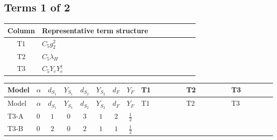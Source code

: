 \documentclass[8pt]{article}
\begin{document}
\begin{landscape}
\subsection*{Terms 1 of 2}
\begin{center}
\begin{tabular}{@{}c >{\raggedright\arraybackslash}p{0.82\linewidth}@{}}
\toprule
Column & Representative term structure \\
\midrule
T1 & \(\displaystyle C_{5} g_{2}^{2}\) \\
\midrule
T2 & \(\displaystyle C_{5} \lambda_H\) \\
\midrule
T3 & \(\displaystyle C_{5} Y_e Y_e^\dagger\) \\
\midrule
\bottomrule
\end{tabular}
\end{center}
\smallskip
\tiny
\begin{longtable}{@{}llcccccc >{\raggedright\arraybackslash}p{0.21\linewidth} >{\raggedright\arraybackslash}p{0.21\linewidth} >{\raggedright\arraybackslash}p{0.21\linewidth}@{}}
\toprule
Model & $\alpha$ & $d_{S_1}$ & $Y_{S_1}$ & $d_{S_2}$ & $Y_{S_2}$ & $d_F$ & $Y_F$ & T1 & T2 & T3 \\
\midrule
\endfirsthead
\toprule
Model & $\alpha$ & $d_{S_1}$ & $Y_{S_1}$ & $d_{S_2}$ & $Y_{S_2}$ & $d_F$ & $Y_F$ & T1 & T2 & T3 \\
\midrule
\endhead
T3-A & $0$ & $1$ & $0$ & $3$ & $1$ & $2$ & $\frac{1}{2}$ & \scriptsize\adjustbox{max width=\linewidth}{$\begin{gathered} - 3 C_{5} g_{2}^{2}\end{gathered}$} & \scriptsize\adjustbox{max width=\linewidth}{$\begin{gathered} 2 C_{5} \lambda_H\end{gathered}$} & \scriptsize\adjustbox{max width=\linewidth}{$\begin{gathered} - C_{5} Y_e Y_e^\dagger\end{gathered}$} \\
\midrule
T3-B & $0$ & $2$ & $0$ & $2$ & $1$ & $1$ & $\frac{1}{2}$ & \scriptsize\adjustbox{max width=\linewidth}{$\begin{gathered} - 3 C_{5} g_{2}^{2}\end{gathered}$} & \scriptsize\adjustbox{max width=\linewidth}{$\begin{gathered} 2 C_{5} \lambda_H\end{gathered}$} & \scriptsize\adjustbox{max width=\linewidth}{$\begin{gathered} - C_{5} Y_e Y_e^\dagger\end{gathered}$} \\

\end{longtable}
\end{landscape}
\end{document}
